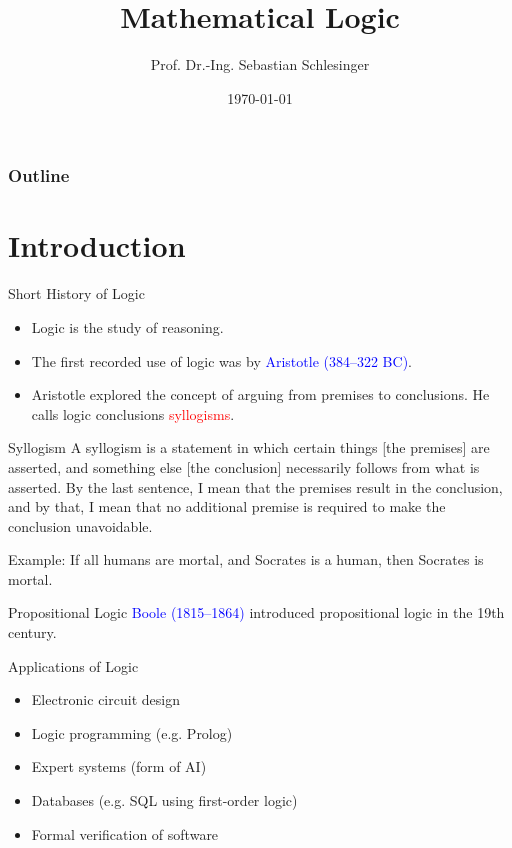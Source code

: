 \documentclass{beamer}
\title[Mathematical Logic]{Mathematical Logic}
\author[Sebastian Schlesinger]{Prof. Dr.-Ing. Sebastian Schlesinger}
\institute[HWR Berlin]{Berlin School for Economics and Law}
\date{\today}
\newcommand{\person}[1]{\textcolor{blue}{#1}}
\newcommand{\highlight}[1]{\textcolor{red}{#1}}
\begin{document}
 \begin{frame}
\titlepage
\end{frame}



\begin{frame}
  \frametitle{Outline}
  \tableofcontents
\end{frame}

\section{Introduction}
\begin{frame}{Short History of Logic}
  \begin{itemize}
    \item Logic is the study of reasoning.
    \item The first recorded use of logic was by \person{Aristotle (384--322 BC)}.
    \item Aristotle explored the concept of arguing from premises to conclusions. He calls logic conclusions \highlight{syllogisms}.
    
   
  \end{itemize}
  \begin{block}{Syllogism}
    A syllogism is a statement in which certain things [the premises] are asserted, and something else [the conclusion] necessarily follows from what is asserted. By the last sentence, I mean that the premises result in the conclusion, and by that, I mean that no additional premise is required to make the conclusion unavoidable.
  \end{block}
  Example: If all humans are mortal, and Socrates is a human, then Socrates is mortal.
\end{frame}

\begin{frame}{Propositional Logic}
  \person{Boole (1815--1864)} introduced propositional logic in the 19th century.
\end{frame}

\begin{frame}{Applications of Logic}
\begin{itemize}
  \item Electronic circuit design
  \item Logic programming (e.g. Prolog)
  \item Expert systems (form of AI)
  \item Databases (e.g. SQL using first-order logic)
  \item Formal verification of software
  \end{itemize}
\end{frame}
\end{document}
